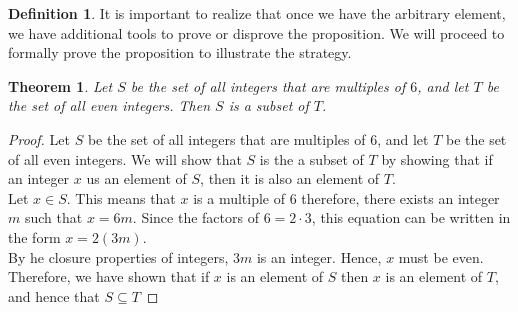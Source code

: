 \documentclass{book}
\newtheorem{theorem}{Theorem}[section]
\theoremstyle{definition}
\newtheorem{definition}{Definition}[section]
\theoremstyle{remark}
\newcommand{\m}{\cdot}
\begin{document}
\begin{definition}
    It is important to realize that once we have the arbitrary element, we have additional tools to prove or disprove the proposition. We will proceed to formally prove the proposition to illustrate the strategy. 
        \newpage
        \begin{tcolorbox}
            \begin{theorem}
                Let $S$ be the set of all integers that are multiples of $6$, and let $T$ be the set of all even integers. Then $S$ is a subset of $T$.
            \end{theorem}
        \end{tcolorbox}
        
        \begin{proof}
            Let $S$ be the set of all integers that are multiples of $6$, and let $T$ be the set of all even integers. We will show that $S$ is the a subset of $T$ by showing that if an integer $x$ us an element of $S$, then it is also an element of $T$. \\
            
            Let $x \in S$. This means that $x$ is a multiple of $6$ therefore, there exists an integer $m$ such that $x=6m$. Since the factors of $6 = 2 \m 3$, this equation can be written in the form $x = 2(3m)$. \\
            By he closure properties of integers, $3m$ is an integer. Hence, $x$ must be even. Therefore, we have shown that if $x$ is an element of $S$ then $x$ is an element of $T$, and hence that $S \subseteq T$
        \end{proof}
\end{definition}
\end{document}
